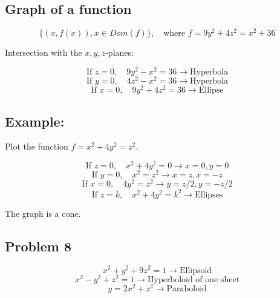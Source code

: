 \documentclass[11pt]{article}
\begin{document}
\subsection{Graph of a function}
\[
\{(x, f(x)), x \in Dom(f)\}, \quad \text{where } f = 9y^2 + 4z^2 = x^2 + 36
\]

Intersection with the $x,y,z$-planes:

\[
\text{If } z = 0, \quad 9y^2 - x^2 = 36 \rightarrow \text{Hyperbola}
\]
\[
\text{If } y = 0, \quad 4z^2 - x^2 = 36 \rightarrow \text{Hyperbola}
\]
\[
\text{If } x = 0, \quad 9y^2 + 4z^2 = 36 \rightarrow \text{Ellipse}
\]

\subsection*{Example:}
Plot the function $f = x^2 + 4y^2 = z^2$.

\[
\text{If } z = 0, \quad x^2 + 4y^2 = 0 \rightarrow x = 0, y = 0
\]
\[
\text{If } y = 0, \quad x^2 = z^2 \rightarrow x = z, x = -z
\]
\[
\text{If } x = 0, \quad 4y^2 = z^2 \rightarrow y = z/2, y = -z/2
\]
\[
\text{If } z = k, \quad x^2 + 4y^2 = k^2 \rightarrow \text{Ellipses}
\]

\begin{center}
\end{center}

The graph is a cone.

\subsection*{Problem 8}
\[
x^2 + y^2 + 9z^2 = 1 \rightarrow \text{Ellipsoid}
\]
\[
x^2 - y^2 + z^2 = 1 \rightarrow \text{Hyperboloid of one sheet}
\]
\[
y = 2x^2 + z^2 \rightarrow \text{Paraboloid}
\]
\end{document}
